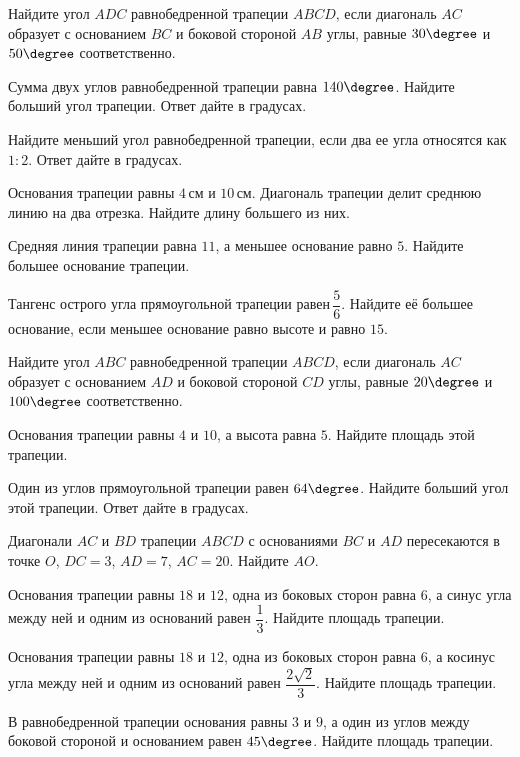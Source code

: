\begin{class}[number=4]
	\begin{listofex}
		\item Найдите угол \( ADC \) равнобедренной трапеции \( ABCD \), если диагональ \( AC \) образует с основанием \( BC \) и боковой стороной \( AB \) углы, равные \( 30\degree \) и \( 50\degree \) соответственно.
		\item Сумма двух углов равнобедренной трапеции равна \( 140\degree \). Найдите больший угол трапеции. Ответ дайте в градусах.
		\item Найдите меньший угол равнобедренной трапеции, если два ее угла относятся как \( 1:2 \). Ответ дайте в градусах.
		\item Основания трапеции равны \( 4 \) см и \( 10 \) см. Диагональ трапеции делит среднюю линию на два отрезка. Найдите длину большего из них.
		\item Средняя линия трапеции равна \( 11 \), а меньшее основание равно \( 5 \). Найдите большее основание трапеции.
		\item Тангенс острого угла прямоугольной трапеции равен \( \dfrac{5}{6} \).  Найдите её большее основание, если меньшее основание равно высоте и равно \( 15 \).
		\item Найдите угол \( ABC \) равнобедренной трапеции \( ABCD \), если диагональ \( AC \) образует с основанием \( AD \) и боковой стороной \( CD \) углы, равные \( 20\degree \) и \( 100\degree \) соответственно.
		\item Основания трапеции равны \( 4 \) и \( 10 \), а высота равна \( 5 \). Найдите площадь этой трапеции.
		\item Один из углов прямоугольной трапеции равен \( 64\degree \). Найдите больший угол этой трапеции. Ответ дайте в градусах.
		\item Диагонали \( AC \) и \( BD \) трапеции \( ABCD \) с основаниями \( BC \) и \( AD \) пересекаются в точке \( O \), \( DC=3 \), \( AD=7 \), \( AC=20 \). Найдите \( AO \).
		\item Основания трапеции равны \( 18 \) и \( 12 \), одна из боковых сторон равна \( 6 \), а синус угла между ней и одним из оснований равен \( \dfrac{1}{3} \). Найдите площадь трапеции.
		\item Основания трапеции равны \( 18 \) и \( 12 \), одна из боковых сторон равна \( 6 \), а косинус угла между ней и одним из оснований равен \( \dfrac{2\sqrt{2}}{3} \). Найдите площадь трапеции.
		\item В равнобедренной трапеции основания равны \( 3 \) и \( 9 \), а один из углов между боковой стороной и основанием равен \( 45\degree \). Найдите площадь трапеции.

\end{listofex}
\end{class}
